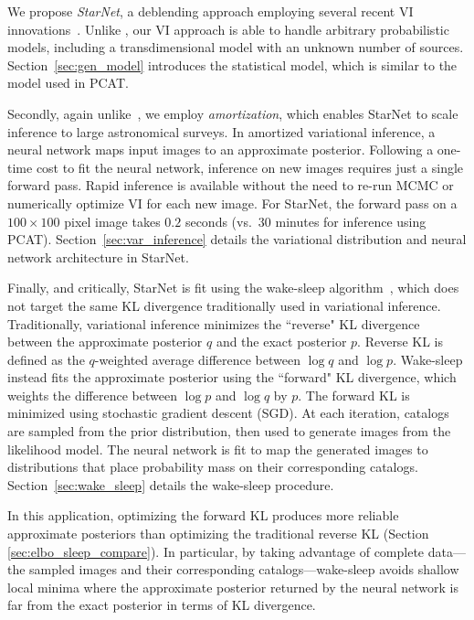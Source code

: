 \nopagebreak[4]

We propose {\itshape StarNet}, a deblending approach employing several recent VI innovations~\cite{zhang2019advances,le2020revisiting}.
Unlike \cite{regier2019_celeste}, our VI approach is able to handle arbitrary probabilistic models, including a transdimensional model with an unknown number of sources. Section~\ref{sec:gen_model} introduces the statistical model, which is similar to the model used in PCAT.

Secondly, again unlike~\cite{regier2019_celeste}, 
we employ {\itshape amortization}, which enables StarNet to scale inference to large astronomical surveys. 
In amortized variational inference, a neural network maps input images to an approximate posterior.
Following a one-time cost to fit the neural network, inference 
on new images requires just a single forward pass.
Rapid inference is available without the need to re-run MCMC or numerically optimize VI for each new image. 
For StarNet, the forward pass on 
a $100 \times 100$ pixel image takes $0.2$ seconds (vs.~30 minutes for inference using PCAT).
Section~\ref{sec:var_inference} details the variational distribution and neural network architecture in StarNet. 

Finally, and critically, StarNet is fit using the wake-sleep algorithm~\cite{Hinton1995wake_sleep}, which does not target the same KL divergence traditionally used in  variational inference. Traditionally, variational inference minimizes the ``reverse" KL divergence between the approximate posterior $q$ and the exact posterior $p$.
Reverse KL is defined as the $q$-weighted average difference between $\log q$ and $\log p$. 
Wake-sleep instead fits the approximate posterior using the ``forward" KL divergence, which weights the difference between $\log p$ and $\log q$ by $p$.
The forward KL is minimized using stochastic gradient descent (SGD). 
At each iteration, catalogs are sampled from the prior distribution, then used to generate images from the likelihood model. 
The neural network is fit to map the generated images to distributions that place probability mass on their corresponding catalogs. Section~\ref{sec:wake_sleep} details the wake-sleep procedure. 

In this application, optimizing the forward KL produces more reliable approximate posteriors than optimizing the traditional reverse KL (Section \ref{sec:elbo_sleep_compare}). 
In particular, by taking advantage of complete data---the sampled images and their corresponding catalogs---wake-sleep avoids shallow local minima where the approximate posterior returned by the neural network is far from the exact posterior in terms of KL divergence. 

